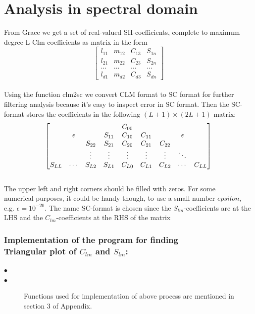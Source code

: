 \documentclass[a4paper,12pt]{report}
\begin{document}
\chapter{Analysis in spectral domain}
From Grace we get a set of real-valued SH-coefficients, complete to maximum degree L
Clm coefficients as matrix in the form\\
\[
\begin{bmatrix}
    l_{11}       & m_{12} & C_{13} & S_{1n} \\
    l_{21}       & m_{22} & C_{23} & S_{2n} \\
    \ldots & \ldots & \ldots & \ldots \\
    l_{d1}       & m_{d2} & C_{d3} & S_{dn}
\end{bmatrix}
\]\\
Using the function clm2sc we convert CLM format to SC format for further filtering analysis because it's easy to inspect error in SC format.
Then the SC-format stores the coefficients in the following $(L + 1)\times (2L + 1)$ matrix:\\

\[
\centering%
\begin{bmatrix}%
      &         &         &         & C_{00}   &         &         &             & \\
      & \epsilon&         & S_{11}  & C_{10}   &C_{11}   &         & \epsilon    & \\
      &         & S_{22}  & S_{21}  & C_{20}   & C_{21}  & C_{22}  &             & \\
      &         &\vdots{} &\vdots{} & \vdots{} &\vdots{} &\vdots{} &\ddots       & \\
      S_{LL}    &\cdots   & S_{L2}  & S_{L1}   & C_{L0}  & C_{L1}  & C_{L2}      &\cdots &C_{LL}
\end{bmatrix}%
\]\\
The upper left and right corners should be filled with zeros. For some \\ numerical purposes,
it could be handy though, to use a small number $epsilon$, e.g. $\epsilon = 10^{-20}$.
The name SC-format is chosen since the $S_{lm}$-coefficients are at the LHS and the $C_{lm}$-coefficients at the RHS of the matrix\\

\subsection{Implementation of the program for finding\\Triangular plot of $C_{lm}$ and $S_{lm}$:}
\begin{description}
\item[$\bullet$]
\item[$\bullet$]Functions used for implementation of above process are mentioned in section 3 of Appendix.
\end{description}
\end{document}
